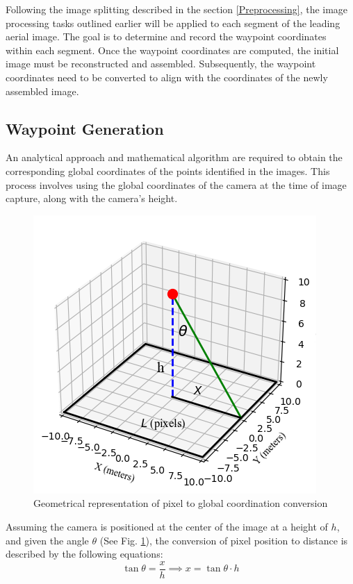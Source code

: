 \documentclass[conference]{IEEEtran}
\begin{document}
	Following the image splitting described in the section
	\ref{Preprocessing}, the image processing tasks outlined earlier will be applied to each segment of the leading aerial image. The goal is to determine and record the waypoint coordinates within each segment. Once the waypoint coordinates are computed, the initial image must be reconstructed and assembled. Subsequently, the waypoint coordinates need to be converted to align with the coordinates of the newly assembled image.
	
	\subsection{Waypoint Generation}\label{Waypoint Generation}
	An analytical approach and mathematical algorithm are required to obtain the corresponding global coordinates of the points identified in the images. This process involves using the global coordinates of the camera at the time of image capture, along with the camera's height.
	
	\begin{figure}[t]
		\centering
		\includegraphics[width=0.6\linewidth]{waypoint_geometry}
		\caption{Geometrical representation of pixel to global coordination conversion}
		\label{fig:waypointgeometry}
	\end{figure}
	
	Assuming the camera is positioned at the center of the image at a height of \( h \), and given the angle \( \theta \) (See Fig. \ref{fig:waypointgeometry}), the conversion of pixel position to distance is described by the following equations:
	\begin{equation}
		\tan \theta = \frac{x}{h} \implies x = \tan \theta  \cdot h
		\label{eq:1}
	\end{equation}
	
\end{document}
